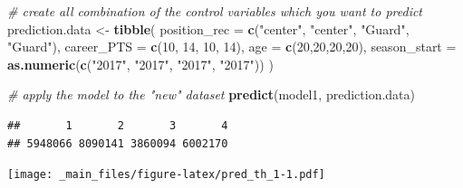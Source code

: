 \documentclass[
]{book}
\newenvironment{Shaded}{\begin{snugshade}}{\end{snugshade}}
\newcommand{\AttributeTok}[1]{\textcolor[rgb]{0.13,0.29,0.53}{#1}}
\newcommand{\CommentTok}[1]{\textcolor[rgb]{0.56,0.35,0.01}{\textit{#1}}}
\newcommand{\DecValTok}[1]{\textcolor[rgb]{0.00,0.00,0.81}{#1}}
\newcommand{\FunctionTok}[1]{\textcolor[rgb]{0.13,0.29,0.53}{\textbf{#1}}}
\newcommand{\NormalTok}[1]{#1}
\newcommand{\OtherTok}[1]{\textcolor[rgb]{0.56,0.35,0.01}{#1}}
\newcommand{\SpecialCharTok}[1]{\textcolor[rgb]{0.81,0.36,0.00}{\textbf{#1}}}
\newcommand{\StringTok}[1]{\textcolor[rgb]{0.31,0.60,0.02}{#1}}
\begin{document}
\begin{Shaded}
\begin{Highlighting}[]
\CommentTok{\# create all combination of the control variables which you want to predict}
\NormalTok{prediction.data }\OtherTok{\textless{}{-}} \FunctionTok{tibble}\NormalTok{(}
  \AttributeTok{position\_rec =} \FunctionTok{c}\NormalTok{(}\StringTok{"center"}\NormalTok{, }\StringTok{"center"}\NormalTok{, }\StringTok{"Guard"}\NormalTok{, }\StringTok{"Guard"}\NormalTok{),}
  \AttributeTok{career\_PTS =} \FunctionTok{c}\NormalTok{(}\DecValTok{10}\NormalTok{, }\DecValTok{14}\NormalTok{, }\DecValTok{10}\NormalTok{, }\DecValTok{14}\NormalTok{),}
  \AttributeTok{age =} \FunctionTok{c}\NormalTok{(}\DecValTok{20}\NormalTok{,}\DecValTok{20}\NormalTok{,}\DecValTok{20}\NormalTok{,}\DecValTok{20}\NormalTok{),}
  \AttributeTok{season\_start =} \FunctionTok{as.numeric}\NormalTok{(}\FunctionTok{c}\NormalTok{(}\StringTok{"2017"}\NormalTok{, }\StringTok{"2017"}\NormalTok{, }\StringTok{"2017"}\NormalTok{, }\StringTok{"2017"}\NormalTok{))}
\NormalTok{)}

\CommentTok{\# apply the model to the "new" dataset}
\FunctionTok{predict}\NormalTok{(model1, }
\NormalTok{        prediction.data)}
\end{Highlighting}
\end{Shaded}

\begin{verbatim}
##       1       2       3       4 
## 5948066 8090141 3860094 6002170
\end{verbatim}

\begin{Shaded}
\end{Shaded}

\texttt{[image: \_main\_files/figure-latex/pred\_th\_1-1.pdf]}
\end{document}
